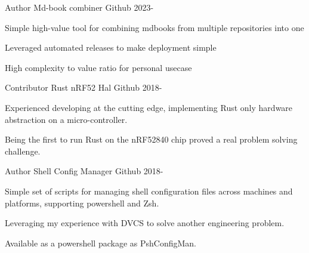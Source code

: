 

\begin{cventries}

  \cventry
    {Author} %
    {Md-book combiner} %
    {Github} %
    {2023-} %
    {
      \begin{cvitems} %
        \item {Simple high-value tool for combining mdbooks from multiple repositories into one}
        \item {Leveraged automated releases to make deployment simple}
        \item {High complexity to value ratio for personal usecase}
      \end{cvitems}
    }

  \cventry
    {Contributor} %
    {Rust nRF52 Hal} %
    {Github} %
    {2018-} %
    {
      \begin{cvitems} %
        \item {Experienced developing at the cutting edge, implementing Rust only hardware abstraction on a micro-controller.}
        \item {Being the first to run Rust on the nRF52840 chip proved a real problem solving challenge.}
      \end{cvitems}
    }
    
    
  \cventry
    {Author} %
    {Shell Config Manager} %
    {Github} %
    {2018-} %
    {
      \begin{cvitems} %
        \item {Simple set of scripts for managing shell configuration files across machines and platforms, supporting powershell and Zsh.}
        \item {Leveraging my experience with DVCS to solve another engineering problem.}
        \item {Available as a powershell package as PshConfigMan.}
      \end{cvitems}
    }


\end{cventries}
